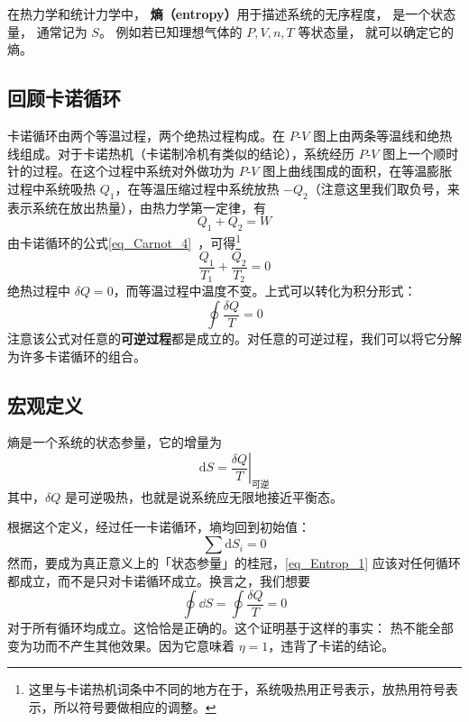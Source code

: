 
在热力学和统计力学中， \textbf{熵（entropy）}用于描述系统的无序程度， 是一个状态量， 通常记为 $S$。 例如若已知理想气体的 $P, V, n, T$ 等状态量， 就可以确定它的熵。

\subsection{回顾卡诺循环}

卡诺循环由两个等温过程，两个绝热过程构成。在 $P$-$V$ 图上由两条等温线和绝热线组成。对于卡诺热机（卡诺制冷机有类似的结论），系统经历 $P$-$V$ 图上一个顺时针的过程。在这个过程中系统对外做功为 $P$-$V$ 图上曲线围成的面积，在等温膨胀过程中系统吸热 $Q_1$，在等温压缩过程中系统放热 $-Q_2$（注意这里我们取负号，来表示系统在放出热量），由热力学第一定律，有
\begin{equation}
Q_1+Q_2=W
\end{equation}
由卡诺循环的公式\autoref{eq_Carnot_4}~，可得\footnote{这里与卡诺热机词条中不同的地方在于，系统吸热用正号表示，放热用符号表示，所以符号要做相应的调整。}
\begin{equation}
\frac{Q_1}{T_1}+\frac{Q_2}{T_2}=0
\end{equation}
绝热过程中 $\delta Q=0$，而等温过程中温度不变。上式可以转化为积分形式：
\begin{equation}
\oint \frac{\delta Q}{T}=0
\end{equation}
注意该公式对任意的\textbf{可逆过程}都是成立的。对任意的可逆过程，我们可以将它分解为许多卡诺循环的组合。

\subsection{宏观定义}

熵是一个系统的状态参量，它的增量为
\begin{equation}
\mathrm{d} S = \left . \frac{\delta Q}{T}\right |_{\text{可逆}}
\end{equation}
其中，$\delta Q$ 是可逆吸热，也就是说系统应无限地接近平衡态。

根据这个定义，经过任一卡诺循环，墒均回到初始值：
\begin{equation} \label{eq_Entrop_1}
\sum{\text{d}S_i=0}
\end{equation}
然而，要成为真正意义上的「状态参量」的桂冠，\autoref{eq_Entrop_1} 应该对任何循环都成立，而不是只对卡诺循环成立。换言之，我们想要
\begin{equation}
\oint \dd S =\oint \frac{\delta Q}{T}=0
\end{equation}
对于所有循环均成立。这恰恰是正确的。这个证明基于这样的事实： 热不能全部变为功而不产生其他效果。因为它意味着 $\eta=1$，违背了卡诺的结论。

